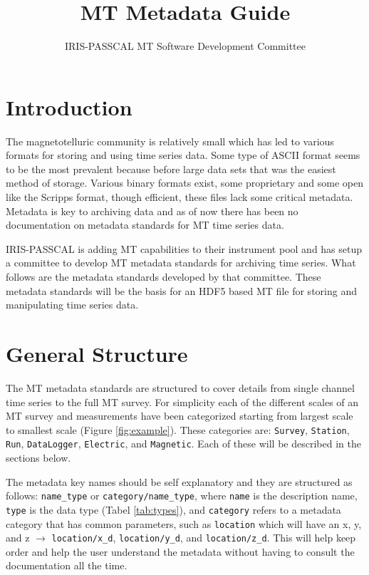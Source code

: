 \documentclass{article}
\title{MT Metadata Guide}
\author[1]{IRIS-PASSCAL MT Software Development Committee}
\affil[1]{IRIS}
\begin{document}
	
\maketitle

\tableofcontents

\newpage

\section{Introduction}

The magnetotelluric community is relatively small which has led to various formats for storing and using time series data.  Some type of ASCII format seems to be the most prevalent because before large data sets that was the easiest method of storage. Various binary formats exist, some proprietary and some open like the Scripps format, though efficient, these files lack some critical metadata.  Metadata is key to archiving data and as of now there has been no documentation on metadata standards for MT time series data.  

IRIS-PASSCAL is adding MT capabilities to their instrument pool and has setup a committee to develop MT metadata standards for archiving time series.  What follows are the metadata standards developed by that committee.  These metadata standards will be the basis for an HDF5 based MT file for storing and manipulating time series data.


\section{General Structure}

The MT metadata standards are structured to cover details from single channel time series to the full MT survey.  For simplicity each of the different scales of an MT survey and measurements have been categorized starting from largest scale to smallest scale (Figure \ref{fig:example}).  These categories are: \verb|Survey|, \verb|Station|, \verb|Run|, \verb|DataLogger|, \verb|Electric|, and \verb|Magnetic|.  Each of these will be described in the sections below.  

The metadata key names should be self explanatory and they are structured as follows: \verb|name_type| or \verb|category/name_type|, where \verb|name| is the description name, \verb|type| is the data type (Tabel \ref{tab:types}), and \verb|category| refers to a metadata category that has common parameters, such as \verb|location| which will have an x, y, and z $\longrightarrow$ \verb|location/x_d|, \verb|location/y_d|, and \verb|location/z_d|. This will help keep order and help the user understand the metadata without having to consult the documentation all the time. 
\end{document}
